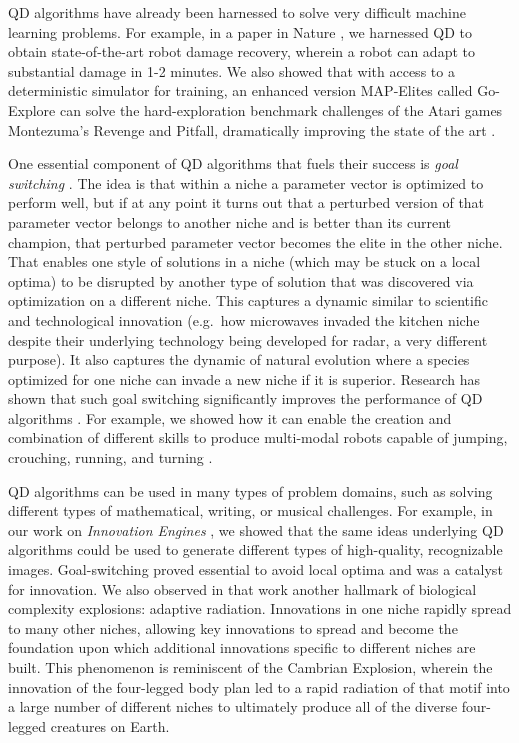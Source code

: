 \documentclass{article}
\begin{document}
QD algorithms have already been harnessed to solve very difficult machine learning problems. For example, in a paper in Nature \cite{cully2015robots}, we harnessed QD to obtain state-of-the-art robot damage recovery, wherein a robot can adapt to substantial damage in 1-2 minutes. We also showed that with access to a deterministic simulator for training, an enhanced version MAP-Elites called Go-Explore can solve the hard-exploration benchmark challenges of the Atari games Montezuma's Revenge and Pitfall, dramatically improving the state of the art \cite{ecoffet2019go}.  

One essential component of QD algorithms that fuels their success is \emph{goal switching} \cite{nguyen2016understanding}. The idea is that within a niche a parameter vector is optimized to perform well, but if at any point it turns out that a perturbed version of that parameter vector belongs to another niche and is better than its current champion, that perturbed parameter vector becomes the elite in the other niche. That enables one style of solutions in a niche (which may be stuck on a local optima) to be disrupted by another type of solution that was discovered via optimization on a different niche. This captures a dynamic similar to scientific and technological innovation (e.g.\ how microwaves invaded the kitchen niche despite their underlying technology being developed for radar, a very different purpose). It also captures the dynamic of natural evolution where a species optimized for one niche can invade a new niche if it is superior.
Research has shown that such goal switching significantly improves the performance of QD algorithms \cite{nguyen2016understanding, mouret2015illuminating, huizinga2018evolving}. For example, we showed how it can enable the creation and combination of different skills to produce multi-modal robots capable of jumping, crouching, running, and turning \cite{huizinga2018evolving}. 

QD algorithms can be used in many types of problem domains, such as solving different types of mathematical, writing, or musical challenges. For example, in our work on \emph{Innovation Engines} \cite{nguyen2016understanding}, we showed that the same ideas underlying QD algorithms could be used to generate different types of high-quality, recognizable images. Goal-switching proved essential to avoid local optima and was a catalyst for innovation. We also observed in that work another hallmark of biological complexity explosions: adaptive radiation. Innovations in one niche rapidly spread to many other niches, allowing key innovations to spread and become the foundation upon which additional innovations specific to different niches are built. This phenomenon is reminiscent of the Cambrian Explosion, wherein the innovation of the four-legged body plan led to a rapid radiation of that motif into a large number of different niches to ultimately produce all of the diverse four-legged creatures on Earth. 
\end{document}
